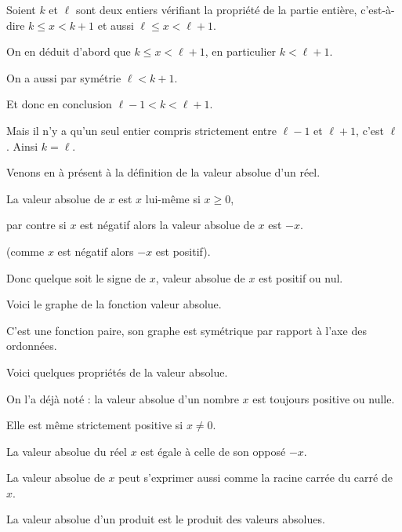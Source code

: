  Soient $k$ et $\ell$ sont deux entiers vérifiant la propriété de la partie entière, 
 c'est-à-dire  $k\leq x< k+1$ et aussi $\ell\leq x< \ell+1$.

 \change 
 
 On en déduit d'abord que $k \leq x < \ell+1$, en particulier $k < \ell+1$.

 \change

 On a aussi par symétrie $\ell<k+1$.

 \change

 Et donc en conclusion $\ell-1<k<\ell+1$. 
 
 \change
 
 Mais il n'y a qu'un seul entier compris strictement entre $\ell-1$
et $\ell+1$, c'est $\ell$. Ainsi $k=\ell$. 


\diapo

Venons en à présent à la définition de la valeur absolue d'un réel.

La valeur absolue de $x$ est $x$ lui-même si $x\geq 0$, 


par contre si $x$ est négatif alors la valeur absolue de $x$ est $-x$.

(comme $x$ est négatif alors $-x$ est positif).

Donc quelque soit le signe de $x$, valeur absolue de $x$ est positif ou nul.


\change

Voici le graphe de la fonction valeur absolue. 

C'est une fonction paire, son graphe est symétrique par rapport à l'axe des ordonnées.


\diapo

Voici quelques propriétés de la valeur absolue. 

On l'a déjà noté : la valeur absolue d'un nombre $x$ est toujours positive ou nulle. 

Elle est même strictement positive si $x\neq 0$.

La valeur absolue du réel $x$ est égale à celle de son opposé $-x$.

\change

La valeur absolue de $x$ peut s'exprimer aussi comme la racine carrée du carré de $x$.

\change

La valeur absolue d'un produit est le produit des valeurs absolues.

\change

